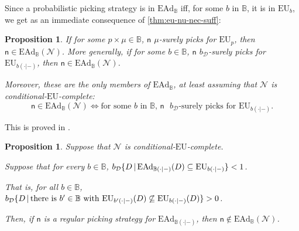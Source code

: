 \documentclass[a4paper]{article}
\newtheorem{proposition}[theorem]{Proposition}
\renewcommand\P{\mathbb{P}} %
\newcommand\EU{\mathrm{EU}}
\newcommand\EAd{\mathrm{EAd}}
\newcommand{\D}{\mathcal{D}}
\newcommand{\Decs}{\mathcal{D}}
\renewcommand\c{\mathsf{c}} %
\newcommand{\n}{\mathsf{n}}
\newcommand\Nu{\mathcal{N}}
\newcommand{\IB}{\mathbb{B}}
\newcommand{\IP}{\P}
\newcommand{\todoold}[2][]{\todo[backgroundcolor=white,bordercolor=orange!10,linecolor=gray!10, #1,caption={},textcolor=gray]{Pre-rev: #2}}
\newcommand{\todooldinfo}[2][]{\todoold[#1]{#2}}
\newcommand\SetDelimiter[1][]{
	\nonscript\,#1\vert \allowbreak \nonscript\,\mathopen{}}
\providecommand\given{\SetDelimiter}
\newenvironment{CCM rewritten}
{\begingroup\color{blue}} %
{\endgroup}              %
\begin{document}
Since a probabilistic picking strategy is in $\EAd_\IB$ iff, for some $b$ in $\IB$, it is in $\EU_b$, we get as an immediate consequence of \cref{thm:eu-nu-nec-suff}:
\begin{proposition}\label{thm:ead-nu-nec-suff}
If for some $p\times \mu\in \IB$, $\n$ $\mu$-surely picks for $\EU_p$, then $\n\in\EAd_\IB(\Nu)$. More generally, if for some $b\in\IB$, $\n$ $b_\Decs$-surely picks for $\EU_{b(\cdot|-)}$, then $\n\in\EAd_\IB(\Nu)$. 

Moreover, these are the only members of $\EAd_\IB$, at least assuming that $\Nu$ is conditional-$\EU$-complete: 
$$\n \in \EAd_\IB(\Nu) \Leftrightarrow \text{for some $b$ in $\IB$, $\n$ $b_\Decs$-surely picks for $\EU_{b(\cdot|-)}$.}$$

\end{proposition}
This is proved in .


	\begin{proposition}\label{thm:ead-nu-reg-nec}
		Suppose that $\Nu$ is conditional-$\EU$-complete.
		
Suppose that for every $b\in\IB$, $b_\D\{D\given \EAd_{\IB(\cdot|-)}(D)\subseteq\EU_{b(\cdot|-)}\}<1$. 

That is, for all $b\in \IB$, $b_\D\{D\given \text{there is $b'\in\IB$ with }\EU_{b'(\cdot|-)}(D)\not\subseteq\EU_{b(\cdot|-)}(D)\}>0$. 
		
		
	Then, if $\n$ is a regular picking strategy for $\EAd_{\IB(\cdot|-)}$, then $\n\notin \EAd_\IB(\Nu)$.
	\end{proposition}
	
\end{document}
